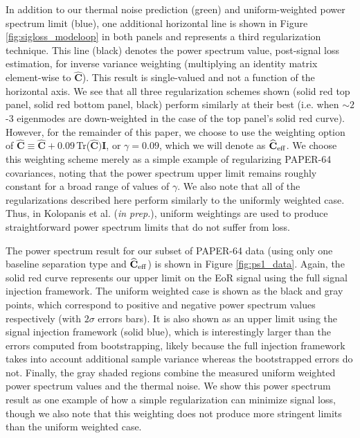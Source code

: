 \documentclass[preprint2,numberedappendix,tighten]{aastex6}  %
\begin{document}
In addition to our thermal noise prediction (green) and uniform-weighted power spectrum limit (blue), one additional horizontal line is shown in Figure \ref{fig:sigloss_modeloop} 
in both panels and represents a third regularization technique. This line (black) denotes the power spectrum value, post-signal loss estimation, for inverse variance weighting (multiplying an identity 
matrix element-wise to $\widehat{\textbf{C}}$). This result is single-valued and not a function of the horizontal axis. We see that all three regularization schemes shown (solid red top panel, solid red bottom panel, black) perform similarly at 
their best (i.e. when $\sim2$-$3$ eigenmodes are down-weighted in the case of the top panel's solid red curve). However, for the remainder of this paper, we choose to use the weighting option of $\widehat{\textbf{C}} \equiv \widehat{\textbf{C}} + 0.09 \,$Tr($\widehat{\textbf{C}})\textbf{I}$, or $\gamma = 0.09$, which we will denote as $\widehat{\textbf{C}}_{\rm eff}$. We choose this weighting scheme merely as a simple example of regularizing PAPER-64 covariances, noting that the power spectrum upper limit remains roughly constant for a broad range of values of $\gamma$. We also note that all of the regularizations described here perform similarly to the uniformly weighted case. Thus, in Kolopanis et al. (\textit{in prep.}), uniform weightings are used to produce straightforward power spectrum limits that do not suffer from loss. 

The power spectrum result for our subset of PAPER-64 data (using only one baseline separation type and $\widehat{\textbf{C}}_{\rm eff}$) is shown in Figure 
\ref{fig:ps1_data}. Again, the solid red curve represents our upper limit on the EoR signal using the full signal injection framework. The uniform weighted case is shown as the black and gray points, which correspond to positive and negative power spectrum values respectively (with 
$2\sigma$ errors bars). It is also shown as an upper limit using the signal injection framework (solid blue), which is interestingly larger than the errors computed from bootstrapping, likely because the full injection framework takes into account additional sample variance whereas the bootstrapped errors do not. Finally, the gray shaded regions combine the measured uniform weighted power spectrum values and the thermal noise. We show this power spectrum result as one example of how a simple regularization can minimize signal loss, though we also note that this weighting does not produce more stringent limits than the uniform weighted case. 
\end{document}
